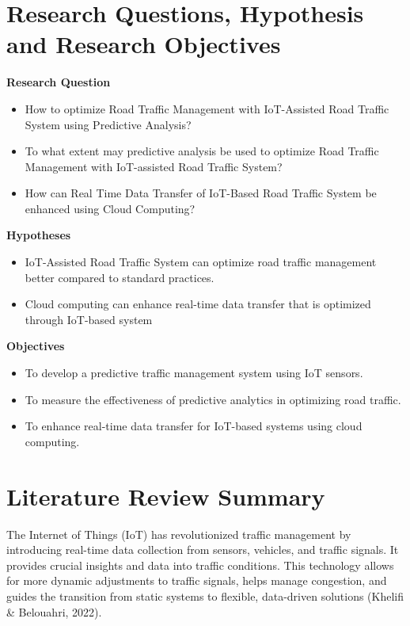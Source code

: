 \documentclass[12pt,a4paper]{article}
\begin{document}
\newpage

\section{Research Questions, Hypothesis and Research Objectives}

\textbf{Research Question }
\begin{itemize}
    \item How to optimize Road Traffic Management with IoT-Assisted Road Traffic System using Predictive Analysis? 

    \item To what extent may predictive analysis be used to optimize Road Traffic Management with IoT-assisted Road Traffic System? 

    \item How can Real Time Data Transfer of IoT-Based Road Traffic System be enhanced using Cloud Computing? 
\end{itemize}
\textbf{Hypotheses }
\begin{itemize}
    \item IoT-Assisted Road Traffic System can optimize road traffic management better compared to standard practices. 

    \item Cloud computing can enhance real-time data transfer that is optimized through IoT-based system
\end{itemize}
\textbf{Objectives}
\begin{itemize}
    \item To develop a predictive traffic management system using IoT sensors. 

    \item To measure the effectiveness of predictive analytics in optimizing road traffic. 

    \item To enhance real-time data transfer for IoT-based systems using cloud computing. 
\end{itemize}

\newpage

\section{Literature Review Summary}

The Internet of Things (IoT) has revolutionized traffic management by introducing real-time data collection from sensors, vehicles, and traffic signals. It provides crucial insights and data into traffic conditions. This technology allows for more dynamic adjustments to traffic signals, helps manage congestion, and guides the transition from static systems to flexible, data-driven solutions (Khelifi \& Belouahri, 2022). \\ 
\end{document}
